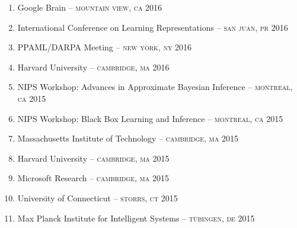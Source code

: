 \documentclass[11pt]{article}
\renewcommand{\section}[1]
{\vspace{1.0\baselineskip}{\Large\textbf{#1}}}
\newcommand{\makecolophon}
{\centering\ding{118} Last modified on \today~\ding{118}}
\begin{document}
\section{Invited Talks}
\begin{enumerate}
  \item
  Google Brain
  -- \textsc{mountain view, ca}
  \hfill 2016
  \item
  International Conference on Learning Representations
  -- \textsc{san juan, pr}
  \hfill 2016
  \item
  PPAML/DARPA Meeting
  -- \textsc{new york, ny}
  \hfill 2016
  \item
  Harvard University
  -- \textsc{cambridge, ma}
  \hfill 2016
  \item
  NIPS Workshop: Advances in Approximate Bayesian Inference
  -- \textsc{montreal, ca}
  \hfill 2015
  \item
  NIPS Workshop: Black Box Learning and Inference
  -- \textsc{montreal, ca}
  \hfill 2015
  \item
  Massachusetts Institute of Technology
  -- \textsc{cambridge, ma}
  \hfill 2015
  \item
  Harvard University
  -- \textsc{cambridge, ma}
  \hfill 2015
  \item
  Microsoft Research
  -- \textsc{cambridge, ma}
  \hfill 2015
  \item
  University of Connecticut
  -- \textsc{storrs, ct}
  \hfill 2015
  \item Max Planck Institute for Intelligent Systems
  -- \textsc{t\"{u}bingen, de}
  \hfill 2015
\end{enumerate}

\end{document}
